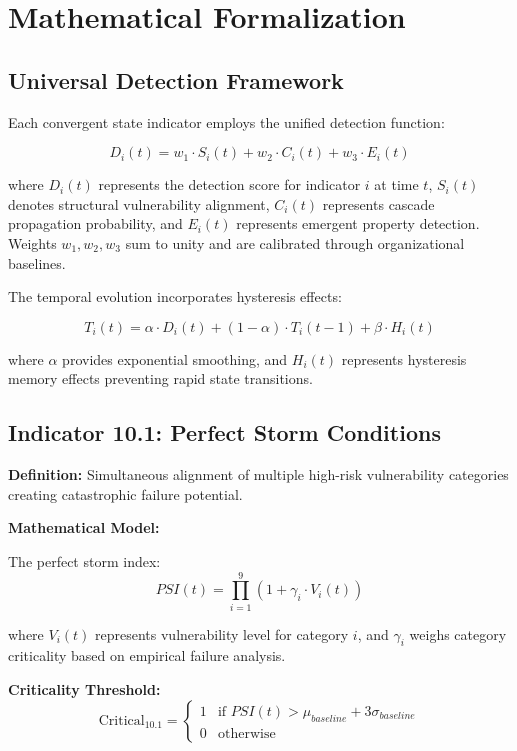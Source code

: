 \documentclass[11pt,a4paper]{article}
\begin{document}
\section{Mathematical Formalization}

\subsection{Universal Detection Framework}

Each convergent state indicator employs the unified detection function:

\begin{equation}
D_i(t) = w_1 \cdot S_i(t) + w_2 \cdot C_i(t) + w_3 \cdot E_i(t)
\end{equation}

where $D_i(t)$ represents the detection score for indicator $i$ at time $t$, $S_i(t)$ denotes structural vulnerability alignment, $C_i(t)$ represents cascade propagation probability, and $E_i(t)$ represents emergent property detection. Weights $w_1, w_2, w_3$ sum to unity and are calibrated through organizational baselines.

The temporal evolution incorporates hysteresis effects:

\begin{equation}
T_i(t) = \alpha \cdot D_i(t) + (1-\alpha) \cdot T_i(t-1) + \beta \cdot H_i(t)
\end{equation}

where $\alpha$ provides exponential smoothing, and $H_i(t)$ represents hysteresis memory effects preventing rapid state transitions.

\subsection{Indicator 10.1: Perfect Storm Conditions}

\textbf{Definition:} Simultaneous alignment of multiple high-risk vulnerability categories creating catastrophic failure potential.

\textbf{Mathematical Model:}

The perfect storm index:
\begin{equation}
PSI(t) = \prod_{i=1}^{9} (1 + \gamma_i \cdot V_i(t))
\end{equation}

where $V_i(t)$ represents vulnerability level for category $i$, and $\gamma_i$ weighs category criticality based on empirical failure analysis.

\textbf{Criticality Threshold:}
\begin{equation}
\text{Critical}_{10.1} = \begin{cases}
1 & \text{if } PSI(t) > \mu_{baseline} + 3\sigma_{baseline} \\
0 & \text{otherwise}
\end{cases}
\end{equation}
\end{document}
